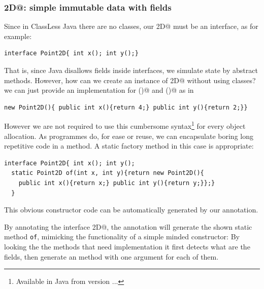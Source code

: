 \subsubsection{\Q@Point2D@: simple immutable data with fields}
Since in ClassLess Java there are no classes, our \Q@Point2D@ must be an interface, as for example:
\begin{lstlisting}
interface Point2D{ int x(); int y();}
\end{lstlisting}
That is, since Java disallows fields inside interfaces,
 we simulate state by abstract methods.
However, how can we create an instance of \Q@Point2D@ without using classes? 
we can just provide an implementation for \Q@x()@ and \Q@y()@ as in
\begin{lstlisting}
new Point2D(){ public int x(){return 4;} public int y(){return 2;}}
\end{lstlisting}
However we are not required to use this cumbersome syntax\footnote{Available in Java from version ...} for every object allocation.
As programmes do, for ease or reuse, we can encapsulate boring long repetitive code in a method. A static factory method in this case is appropriate:
\begin{lstlisting}
interface Point2D{ int x(); int y();
  static Point2D of(int x, int y){return new Point2D(){
    public int x(){return x;} public int y(){return y;}};}
  }
\end{lstlisting}
This obvious constructor code can be automatically generated by our \mixin annotation.

By annotating the interface \Q@Point2D@, the annotation will generate the shown static method \texttt{of}, mimicking the functionality of a simple minded constructor:
By looking the the methods that need implementation it first detects what are the fields, then 
generate an \Q@of@ method with one argument for each of them.

